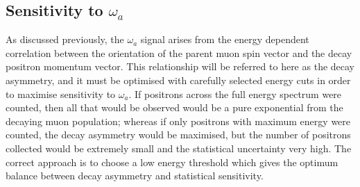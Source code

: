 \subsection{Sensitivity to $\omega_{a}$}\label{subsec:SensitivityToOmegaA}
% 
As discussed previously, the $\omega_{a}$ signal arises from the energy dependent correlation between the orientation of the parent muon spin vector and the decay positron momentum vector. This relationship will be referred to here as the decay asymmetry, and it must be optimised with carefully selected energy cuts in order to maximise sensitivity to $\omega_{a}$. If positrons across the full energy spectrum were counted, then all that would be observed would be a pure exponential from the decaying muon population; whereas if only positrons with maximum energy were counted, the decay asymmetry would be maximised, but the number of positrons collected would be extremely small and the statistical uncertainty very high. The correct approach is to choose a low energy threshold which gives the optimum balance between decay asymmetry and statistical sensitivity. 

